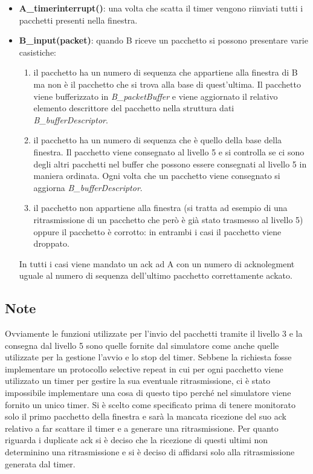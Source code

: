 \documentclass[a4paper]{article}
\begin{document}
\begin{itemize}
\begin{enumerate}
\end{enumerate}

\item \textbf{A\_timerinterrupt()}: una volta che scatta il timer vengono riinviati tutti i pacchetti presenti nella finestra.

\item \textbf{B\_input(packet)}:  quando B riceve un pacchetto si possono presentare varie casistiche:

\begin{enumerate}
\item il pacchetto ha un numero di sequenza che appartiene alla finestra di B ma non è il pacchetto che si trova alla base di quest'ultima. Il pacchetto viene bufferizzato in \emph{B\_packetBuffer} e viene aggiornato il relativo elemento descrittore del pacchetto nella struttura dati \emph{B\_bufferDescriptor}.
\item il pacchetto ha un numero di sequenza che è quello della base della finestra. Il pacchetto viene consegnato al livello 5 e si controlla se ci sono degli altri pacchetti nel buffer che possono essere consegnati al livello 5 in maniera ordinata. Ogni volta che un pacchetto viene consegnato si aggiorna \emph{B\_bufferDescriptor}.
\item il pacchetto non appartiene alla finestra (si tratta ad esempio di una ritrasmissione di un pacchetto che  però è già stato trasmesso al livello 5) oppure il pacchetto è corrotto: in entrambi i casi il pacchetto viene droppato. 
\end{enumerate}

In tutti i casi viene mandato un ack ad A con un numero di acknolegment uguale al numero di sequenza dell'ultimo pacchetto correttamente ackato.
\end{itemize}
\subsection{Note}
Ovviamente le funzioni utilizzate per l'invio del pacchetti tramite il livello 3 e la consegna dal livello 5 sono quelle fornite dal simulatore come anche quelle utilizzate per la gestione l'avvio e lo stop del timer. Sebbene la richiesta fosse implementare un protocollo selective repeat in cui per ogni pacchetto viene utilizzato un timer per gestire la sua eventuale ritrasmissione, ci è stato impossibile implementare una cosa di questo tipo perché nel simulatore viene fornito un unico timer. Si è scelto come specificato prima di tenere monitorato solo il primo pacchetto della finestra e sarà la mancata ricezione del suo ack relativo a far scattare il timer e a generare una ritrasmissione. Per quanto riguarda i duplicate ack si è deciso che la ricezione di questi ultimi non determinino una ritrasmissione e si è deciso di affidarsi solo alla ritrasmissione generata dal timer.
\end{document}
